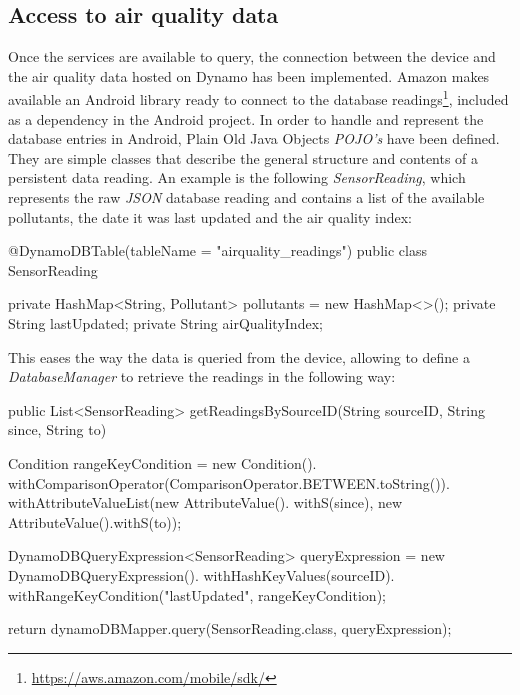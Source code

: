 \subsection{Access to air quality data}
Once the services are available to query, the connection between the device and the air quality data hosted on Dynamo has been implemented. Amazon makes available an Android library ready to connect to the database readings\footnote{\url{https://aws.amazon.com/mobile/sdk/}}, included as a dependency in the Android project. In order to handle and represent the database entries in Android, Plain Old Java Objects \textit{POJO's} have been defined. They are simple classes that describe the general structure and contents of a persistent data reading. An example is the following \textit{SensorReading}, which represents the raw \textit{JSON} database reading  and contains a list of the available pollutants, the date it was last updated and the air quality index:

{\centering
\begin{spverbatim}

@DynamoDBTable(tableName = "airquality_readings")
public class SensorReading {

    private HashMap<String, Pollutant> pollutants = new HashMap<>();
    private String lastUpdated;
    private String airQualityIndex;
}
\end{spverbatim}
\par
}

This eases the way the data is queried from the device, allowing to define a \textit{DatabaseManager} to retrieve the readings in the following way: 

{\centering
\begin{spverbatim}
public List<SensorReading> getReadingsBySourceID(String sourceID, String since, String to) {

  Condition rangeKeyCondition = new Condition().
    withComparisonOperator(ComparisonOperator.BETWEEN.toString()).
    withAttributeValueList(new AttributeValue().
    withS(since), new AttributeValue().withS(to));

  DynamoDBQueryExpression<SensorReading> queryExpression = new
    DynamoDBQueryExpression().
    withHashKeyValues(sourceID).
    withRangeKeyCondition("lastUpdated", rangeKeyCondition);
  
return dynamoDBMapper.query(SensorReading.class, queryExpression);
}
\end{spverbatim}
\par
}

